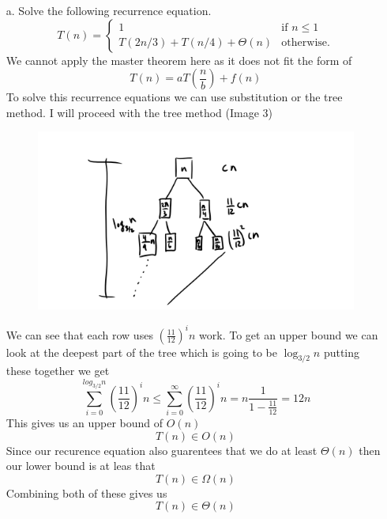 \documentclass{article}
\begin{document}
\begin{itemize}
\item [a.] Solve the following recurrence equation. \\
\begin{equation*}
T(n) =
\begin{cases}
1 &\text{if $n\leq 1$}\\
T(2n/3)+T(n/4)+\Theta(n) &\text{otherwise.}
\end{cases}
\end{equation*}
We cannot apply the master theorem here as it does not fit the form of
$$T(n) = aT(\frac{n}{b}) + f(n)$$
To solve this recurrence equations we can use substitution or the tree method.
I will proceed with the tree method (Image 3)
\begin{figure}
    \includegraphics[width=\linewidth]{Image 3.png}
\end{figure}
We can see that each row uses $(\frac{11}{12})^in$ work.
To get an upper bound we can look at the deepest part of the tree which is going to be $\log_{3/2}n$ putting these together we get
$$\sum_{i=0}^{log_{3/2}n}(\frac{11}{12})^in \leq \sum_{i=0}^{\infty}(\frac{11}{12})^in = n\frac{1}{1-\frac{11}{12}} = 12n $$
This gives us an upper bound of $O(n)$
$$ T(n) \in O(n) $$
Since our recurence equation also guarentees that we do at least $\Theta(n)$ then our lower bound is at leas that
$$ T(n) \in \Omega(n)$$
Combining both of these gives us
$$ T(n) \in \Theta(n) $$


\end{itemize}
\end{document}
